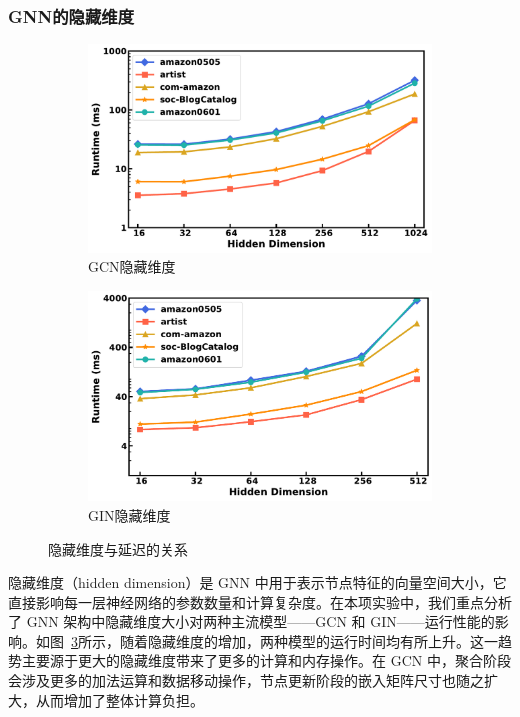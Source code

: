 \subsubsection{GNN的隐藏维度}
\begin{figure}[htbp]
    \centering
    \begin{subfigure}[b]{0.48\textwidth}
        \centering
        \includegraphics[width=\textwidth]{images/gcn_hidden_dim_runtime.pdf}
        \caption{GCN隐藏维度}
        \label{fig:subfig1}
    \end{subfigure}
    \hfill
    \begin{subfigure}[b]{0.48\textwidth}
        \centering
        \includegraphics[width=\textwidth]{images/gin_hidden_dim_runtime.pdf}
        \caption{GIN隐藏维度}
        \label{fig:subfig2}
    \end{subfigure}
    \caption{隐藏维度与延迟的关系}
    \label{fig:Hidden Dimension}
\end{figure}
隐藏维度（hidden dimension）是 GNN 中用于表示节点特征的向量空间大小，它直接影响每一层神经网络的参数数量和计算复杂度。在本项实验中，我们重点分析了 GNN 架构中隐藏维度大小对两种主流模型——GCN 和 GIN——运行性能的影响。如图~\ref{fig:Hidden Dimension}所示，随着隐藏维度的增加，两种模型的运行时间均有所上升。这一趋势主要源于更大的隐藏维度带来了更多的计算和内存操作。在 GCN 中，聚合阶段会涉及更多的加法运算和数据移动操作，节点更新阶段的嵌入矩阵尺寸也随之扩大，从而增加了整体计算负担。

